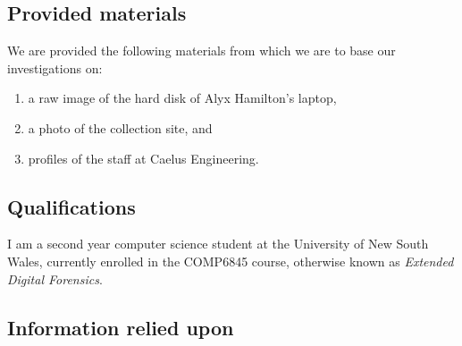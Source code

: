 
\subsection{Provided materials} %
\begin{myenum}
     \item We are provided the following materials from which we are to base our investigations on:
         \begin{enumerate}
            \item a raw image of the hard disk of Alyx Hamilton's laptop,
            \item a photo of the collection site, and 
            \item profiles of the staff at Caelus Engineering.
         \end{enumerate}
\end{myenum}
\label{sub:provided_materials}


\subsection{Qualifications} %
\begin{myenum}
     \item I am a second year computer science student at the University of New South Wales, currently enrolled in the COMP6845 course, otherwise known as \emph{Extended Digital Forensics}.
\end{myenum}
\label{sub:qualifications}


\subsection{Information relied upon} %
\label{sub:information_relied_upon}

